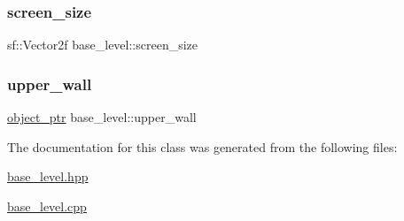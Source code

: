 \mbox{\label{classbase__level_a69702ca202fa2a3a4c83faaa807971c2}} 
\subsubsection{\texorpdfstring{screen\+\_\+size}{screen\_size}}
{\footnotesize\ttfamily sf\+::\+Vector2f base\+\_\+level\+::screen\+\_\+size\hspace{0.3cm}{\ttfamily [private]}}

\mbox{\label{classbase__level_a5e4ab9bce71cb388025305d0f20cb7bf}} 
\subsubsection{\texorpdfstring{upper\+\_\+wall}{upper\_wall}}
{\footnotesize\ttfamily \hyperlink{drawable_8hpp_aab5add95f06d2ba25dbfed8eb07274fa}{object\+\_\+ptr} base\+\_\+level\+::upper\+\_\+wall\hspace{0.3cm}{\ttfamily [private]}}



The documentation for this class was generated from the following files\+:\begin{DoxyCompactItemize}
\item 
\hyperlink{base__level_8hpp}{base\+\_\+level.\+hpp}\item 
\hyperlink{base__level_8cpp}{base\+\_\+level.\+cpp}\end{DoxyCompactItemize}
